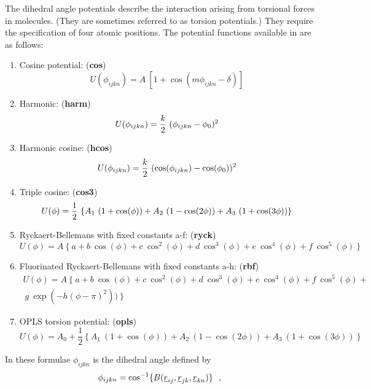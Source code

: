 The dihedral angle potentials describe
the interaction arising from torsional forces in molecules.  (They
are sometimes referred to as torsion potentials.)  They require
the specification of four atomic positions.  The potential
functions available in \D are as follows:
\begin{enumerate}
\item Cosine potential:  ({\bf cos})
\begin{equation}
U(\phi_{ijkn}) = A~\left [ 1 + \cos(m\phi_{ijkn} - \delta)\right]
\end{equation}
\item Harmonic:  ({\bf harm})
\begin{equation}
U(\phi_{ijkn}) = {k \over 2}~(\phi_{ijkn} - \phi_{0})^{2}
\end{equation}
\item Harmonic cosine:  ({\bf hcos})
\begin{equation}
U(\phi_{ijkn}) = {k \over 2}~(\cos(\phi_{ijkn}) - \cos(\phi_{0}))^{2}
\end{equation}
\item Triple cosine:  ({\bf cos3})
\begin{equation}
U(\phi) = {1 \over 2}~\{A_{1}~(1+\cos(\phi)) + A_{2}~(1-\cos(2\phi)) + A_{3}~(1+\cos(3\phi))\}
\end{equation}
\item Ryckaert-Bellemans \cite{ryckaert-75a} with fixed constants
a-f: ({\bf ryck})
\begin{equation}
U(\phi) = A~\{~a+b~\cos(\phi)+c~\cos^{2}(\phi)+d~\cos^{3}(\phi)+e~\cos^{4}(\phi)+f~\cos^{5}(\phi)~\}
\end{equation}
\item Fluorinated Ryckaert-Bellemans \cite{schmidt-96a} with fixed
constants a-h:  ({\bf rbf})
\begin{eqnarray}
U(\phi) = A~\{~a+b~\cos(\phi)+c~\cos^{2}(\phi)+d~\cos^{3}(\phi)+e~\cos^{4}(\phi)+f~\cos^{5}(\phi)+ \nonumber \\
~g~\exp(-h(\phi-\pi)^{2}))~\}
\end{eqnarray}
\item OPLS torsion potential:  ({\bf opls})
\begin{equation}
U(\phi)=A_{0}+\frac{1}{2} \left\{ A_{1}~(1+\cos(\phi))+A_{2}~(1-\cos(2\phi))+A_{3}~(1+\cos(3\phi)) \right\}
\end{equation}
\end{enumerate}
In these formulae $\phi_{ijkn}$ is the dihedral angle defined by
\begin{equation}
\phi_{ijkn}=\cos^{-1}\{B(\mbox{$\underline{r}$}_{ij},\mbox{$\underline{r}$}_{jk},\mbox{$\underline{r}$}_{kn})\}~~,
\end{equation}
